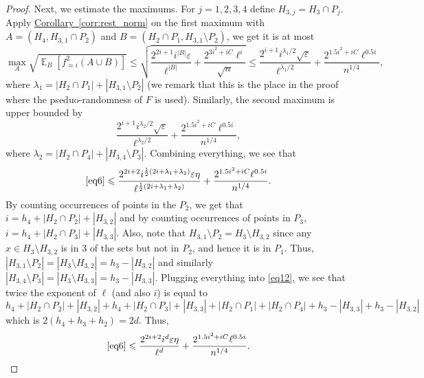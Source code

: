 \documentclass[11pt]{article}
\newcommand{\expref}[2]{\texorpdfstring{\hyperref[#2]{#1~\ref{#2}}}{#1~\ref{#2}}}
\newcommand\card[1]{\left| {#1} \right|}
\newcommand\Expect[2]{{\mathop{\mathbb{E}}_{#1}\left[ {#2} \right]}}
\newcommand\half{\frac{1}{2}}
\newcommand\eps{\varepsilon}
\renewcommand\leq{\leqslant}
\newcommand\approxlvlfn[2]{{#1}_{\approx{#2}}}
\begin{document}
\begin{proof}
Next, we estimate the maximums. For $j=1,2,3,4$ define $H_{3,j} = H_3\cap P_j$.
Apply \expref{Corollary}{corr:rest_norm} on the first maximum with $A = (H_4, H_{3,1}\cap P_2)$
and $B = (H_2\cap P_1, H_{3,1}\setminus P_2)$, we get it is at most%
\[
\max_{A}
\sqrt{\Expect{B}{\approxlvlfn{f}{i}^2(A\cup B)}}
\leq \sqrt{\frac{2^{2i+1} i^{\card{B}} \eps}{\ell^{\card{B}}} + \frac{2^{3i^2+iC} \ell^{i}}{\sqrt{n}}}
\leq \frac{2^{i+1} i^{\lambda_1/2}\sqrt{\eps}}{\ell^{\lambda_1/2}}
     +\frac{2^{1.5i^2+iC} \ell^{0.5i}}{n^{1/4}},
\]
where $\lambda_1 = \card{H_2\cap P_1}+\card{H_{3,1}\setminus P_2}$ (we remark that this is the place in the proof
%
where  %
the pseduo-randomness of
$F$ is used). Similarly, the second maximum is upper bounded by
\[
\frac{2^{i+1} i^{\lambda_2/2}\sqrt{\eps}}{\ell^{\lambda_2/2}}%
     +\frac{2^{1.5i^2+iC} \ell^{0.5i}}{n^{1/4}},
\]
where $\lambda_2 = \card{H_2\cap P_4}+\card{H_{3,4}\setminus P_3}$.
Combining everything, we see that
\begin{equation}\label{eq12}
\eqref{eq6}\leq
\frac{2^{2i+2} i^{\half(2i+\lambda_1+\lambda_2) } \eps\eta}{\ell^{\half(2i+\lambda_1+\lambda_2)}}
+\frac{2^{1.5i^2+iC} \ell^{0.5i}}{n^{1/4}}.
\end{equation}
By counting occurrences of points in the $P_2$, we get that $i = h_4 + \card{H_2\cap P_2} + \card{H_{3,2}}$
and by counting occurrences of points in $P_3$, $i = h_4 + \card{H_2\cap P_3} + \card{H_{3,3}}$. Also,
note that $H_{3,1}\setminus P_2 = H_3\setminus H_{3,2}$ since any $x\in H_3\setminus H_{3,2}$ is in $3$ of the sets
but not in $P_2$, and hence it is in $P_1$. Thus,
$\card{H_{3,1}\setminus P_2} = \card{H_3\setminus H_{3,2}} = h_3 - \card{H_{3,2}}$
and similarly $\card{H_{3,4}\setminus P_3} = \card{H_3\setminus H_{3,3}} = h_3 - \card{H_{3,3}}$.
Plugging everything into \eqref{eq12}, we see that twice the exponent of $\ell$ (and also $i$) is equal to
\[
h_4 + \card{H_2\cap P_2} + \card{H_{3,2}}
+h_4 + \card{H_2\cap P_3} + \card{H_{3,3}}
+\card{H_2\cap P_1}+\card{H_2\cap P_4}+h_3 - \card{H_{3,3}}+h_3 - \card{H_{3,2}}
\]
which is $2(h_4+h_3+h_2) = 2d$.
Thus,
\[
\eqref{eq6}\leq
\frac{2^{2i+2} i^{d} \eps\eta}{\ell^{d}}
+\frac{2^{1.5i^2+iC} \ell^{0.5i}}{n^{1/4}}.
\qedhere       %
\]
\end{proof}
\end{document}
